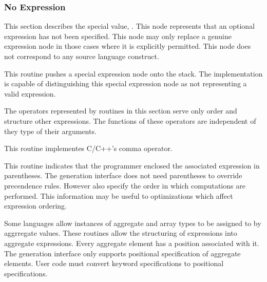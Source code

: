 \subsubsection{No Expression}

This section describes the special value, .  This
node represents that an optional expression has not been specified.
This node may only replace a genuine expression node in those cases
where it is explicitly permitted.  This node does not correspond to
any source language construct.  

\begin{functionality}
This routine pushes a special expression node onto the stack.  The
implementation is capable of distinguishing this special expression
node as not representing a valid expression.
\end{functionality}

The operators represented by routines in this section serve only order
and structure other expressions.  The functions of these operators are
independent of they type of their arguments.

\begin{functionality}
This routine implementes C/C++'s comma operator.
\end{functionality}

\begin{functionality}
This routine indicates that the programmer enclosed the associated
expression in parentheses.  The generation interface does not need
parentheses to override precendence rules.  However also specify the
order in which computations are performed.  This information may be
useful to optimizations which affect expression ordering.  
\end{functionality}

Some languages allow instances of aggregate and array types to be
assigned to by aggrregate values.  These routines allow the
structuring of expressions into aggregate expressions.  Every
aggregate element has a position associated with it.  The generation
interface only supports positional specification of aggregate
elements.  User code must convert keyword specifications to positional
specifications.  

